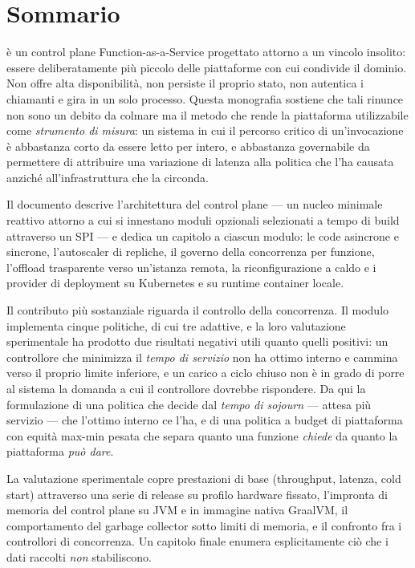 \chapter*{Sommario}

\nf{} \`e un control plane Function-as-a-Service progettato attorno a un vincolo
insolito: essere deliberatamente pi\`u piccolo delle piattaforme con cui
condivide il dominio. Non offre alta disponibilit\`a, non persiste il proprio
stato, non autentica i chiamanti e gira in un solo processo. Questa monografia
sostiene che tali rinunce non sono un debito da colmare ma il metodo che rende
la piattaforma utilizzabile come \emph{strumento di misura}: un sistema in cui
il percorso critico di un'invocazione \`e abbastanza corto da essere letto per
intero, e abbastanza governabile da permettere di attribuire una variazione di
latenza alla politica che l'ha causata anzich\'e all'infrastruttura che la
circonda.

Il documento descrive l'architettura del control plane --- un nucleo minimale
reattivo attorno a cui si innestano moduli opzionali selezionati a tempo di
build attraverso un SPI --- e dedica un capitolo a ciascun modulo: le code
asincrone e sincrone, l'autoscaler di repliche, il governo della concorrenza per
funzione, l'offload trasparente verso un'istanza remota, la riconfigurazione a
caldo e i provider di deployment su Kubernetes e su runtime container locale.

Il contributo pi\`u sostanziale riguarda il controllo della concorrenza. Il
modulo  implementa cinque politiche, di cui tre
adattive, e la loro valutazione sperimentale ha prodotto due risultati negativi
utili quanto quelli positivi: un controllore che minimizza il \emph{tempo di
servizio} non ha ottimo interno e cammina verso il proprio limite inferiore, e
un carico a ciclo chiuso non \`e in grado di porre al sistema la domanda a cui
il controllore dovrebbe rispondere. Da qui la formulazione di una politica che
decide dal \emph{tempo di sojourn} --- attesa pi\`u servizio --- che l'ottimo
interno ce l'ha, e di una politica a budget di piattaforma con equit\`a max-min
pesata che separa quanto una funzione \emph{chiede} da quanto la piattaforma
\emph{pu\`o dare}.

La valutazione sperimentale copre prestazioni di base (throughput, latenza,
cold start) attraverso una serie di release su profilo hardware fissato,
l'impronta di memoria del control plane su JVM e in immagine nativa GraalVM, il
comportamento del garbage collector sotto limiti di memoria, e il confronto fra
i controllori di concorrenza. Un capitolo finale enumera esplicitamente ci\`o
che i dati raccolti \emph{non} stabiliscono.
